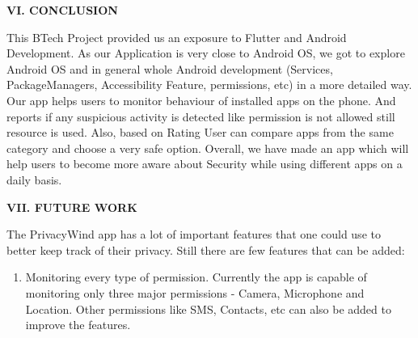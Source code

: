 \documentclass[12pt]{report}
\renewcommand{\_}{\kern-1.5pt\textunderscore\kern-1.5pt}
\begin{document}
\begin{multicols}{2}
\vspace{\baselineskip}

\vspace{\baselineskip}
\begin{Center}
{\fontsize{10pt}{12.0pt}\selectfont \textbf{VI. CONCLUSION}}
\end{Center}

\vspace{\baselineskip}
\setlength{\parskip}{12.0pt}
\begin{justify}
{\fontsize{10pt}{12.0pt}\selectfont This BTech Project provided us an exposure to Flutter and Android Development. As our Application is very close to Android OS, we got to explore Android OS and in general whole Android development (Services, PackageManagers, Accessibility Feature, permissions, etc) in a more detailed way. Our app helps users to monitor behaviour of installed apps on the phone. And reports if any suspicious activity is detected like permission is not allowed still resource is used. Also, based on Rating User can compare apps from the same category and choose a very safe option. Overall, we have made an app which will help users to become more aware about Security while using different apps on a daily basis.\par}
\end{justify}

\vspace{\baselineskip}
\setlength{\parskip}{0.0pt}

\vspace{\baselineskip}
\begin{Center}
{\fontsize{10pt}{12.0pt}\selectfont \textbf{VII. FUTURE WORK}}
\end{Center}

\vspace{\baselineskip}
\begin{justify}
{\fontsize{10pt}{12.0pt}\selectfont The PrivacyWind app has a lot of important features that one could use to better keep track of their privacy. Still there are few features that can be added:\par}
\end{justify}
\begin{enumerate}
	\item {\fontsize{10pt}{12.0pt}\selectfont Monitoring every type of permission. Currently the app is capable of monitoring only three major permissions - Camera, Microphone and Location. Other permissions like SMS, Contacts, etc can also be added to improve the features.\par}


\end{enumerate}
\end{multicols}
\end{document}
